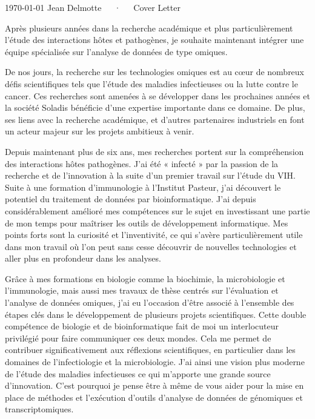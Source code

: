 \documentclass[11pt, a4paper]{awesome-cv}
\begin{document}
\makecvheader[R]

\makecvfooter
  {\today}
  {Jean Delmotte~~~·~~~Cover Letter}
  {\thepage}
\makelettertitle

\begin{cvletter}

Après plusieurs années dans la recherche académique et plus particulièrement l’étude des interactions hôtes et pathogènes, je souhaite maintenant intégrer une équipe spécialisée sur l’analyse de données de type omiques.

De nos jours, la recherche sur les technologies omiques est au cœur de nombreux défis scientifiques tels que l’étude des maladies infectieuses ou la lutte contre le cancer. Ces recherches sont amenées à se développer dans les prochaines années et la société Soladis bénéficie d’une expertise importante dans ce domaine. De plus, ses liens avec la recherche académique, et d’autres partenaires industriels en font un acteur majeur sur les projets ambitieux à venir.

Depuis maintenant plus de six ans, mes recherches portent sur la compréhension des interactions hôtes pathogènes. J'ai été « infecté » par la passion de la recherche et de l'innovation à la suite d’un premier travail sur l'étude du VIH. Suite à une formation d'immunologie à l’Institut Pasteur, j’ai découvert le potentiel du traitement de données par bioinformatique. J’ai depuis considérablement amélioré mes compétences sur le sujet en investissant une partie de mon temps pour maîtriser les outils de développement informatique. Mes points forts sont la curiosité et l'inventivité, ce qui s'avère particulièrement utile dans mon travail où l'on peut sans cesse découvrir de nouvelles technologies et aller plus en profondeur dans les analyses.

Grâce à mes formations en biologie comme la biochimie, la microbiologie et l’immunologie, mais aussi mes travaux de thèse centrés sur l’évaluation et l’analyse de données omiques, j’ai eu l’occasion d’être associé à l'ensemble des étapes clés dans le développement de plusieurs projets scientifiques. Cette double compétence de biologie et de bioinformatique fait de moi un interlocuteur privilégié pour faire communiquer ces deux mondes. Cela me permet de contribuer significativement aux réflexions scientifiques, en particulier dans les domaines de l’infectiologie et la microbiologie. J'ai ainsi une vision plus moderne de l’étude des maladies infectieuses ce qui m’apporte une grande source d’innovation. C'est pourquoi je pense être à même de vous aider pour la mise en place de méthodes et l'exécution d’outils d'analyse de données de génomiques et transcriptomiques.


\end{cvletter}
\end{document}
